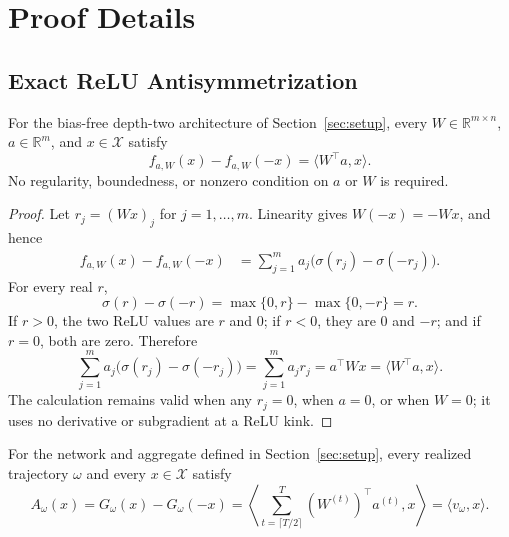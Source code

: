 \appendix
\section{Proof Details}
\label{sec:proof-details}

\subsection{Exact ReLU Antisymmetrization}
\label{app:relu-antisymmetrization}

\begin{lemma}
\label{lem:step-001-per-iterate}
For the bias-free depth-two architecture of Section~\ref{sec:setup}, every
$W\in\mathbb R^{m\times n}$, $a\in\mathbb R^m$, and
$x\in\mathcal X$ satisfy
\[
 f_{a,W}(x)-f_{a,W}(-x)=\langle W^\top a,x\rangle.
\]
No regularity, boundedness, or nonzero condition on $a$ or $W$ is required.
\end{lemma}

\begin{proof}
Let $r_j=(Wx)_j$ for $j=1,\ldots,m$.  Linearity gives
$W(-x)=-Wx$, and hence
\[
\begin{aligned}
 f_{a,W}(x)-f_{a,W}(-x)
 &=\sum_{j=1}^m a_j\bigl(\sigma(r_j)-\sigma(-r_j)\bigr).
\end{aligned}
\]
For every real $r$,
\[
 \sigma(r)-\sigma(-r)
 =\max\{0,r\}-\max\{0,-r\}=r.
\]
If $r>0$, the two ReLU values are $r$ and $0$; if $r<0$, they are $0$
and $-r$; and if $r=0$, both are zero.  Therefore
\[
\sum_{j=1}^m a_j\bigl(\sigma(r_j)-\sigma(-r_j)\bigr)
=\sum_{j=1}^m a_jr_j
=a^\top Wx
=\langle W^\top a,x\rangle.
\]
The calculation remains valid when any $r_j=0$, when $a=0$, or when
$W=0$; it uses no derivative or subgradient at a ReLU kink.
\end{proof}

\begin{proposition}
\label{prop:step-001-aggregate}
For the network and aggregate defined in Section~\ref{sec:setup}, every
realized trajectory $\omega$ and every $x\in\mathcal X$ satisfy
\[
 A_\omega(x)=G_\omega(x)-G_\omega(-x)
 =\left\langle
 \sum_{t=\lceil T/2\rceil}^{T}(W^{(t)})^\top a^{(t)},x
 \right\rangle
 =\langle v_\omega,x\rangle.
\]
\end{proposition}

